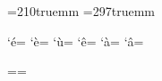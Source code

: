 \relax

\pdfpagewidth=210truemm\relax
\pdfpageheight=297truemm\relax



%
\catcode`é=\active{}
\catcode`è=\active{}
\catcode`ù=\active{}
\catcode`ê=\active{}
\catcode`à=\active{}
\catcode`â=\active{}

\headline={\hfill}\footline={\hfill}%

\def\swap#1#2{\let\temp#1\let#1#2\let#2\temp}
\swap\epsilon\varepsilon
\swap\theta\vartheta
\swap\rho\varrho

\def\e{{\rm e}} 
\def\log{\mathop{\rm log}\nolimits}

\def\ch{\mathop{\rm ch}\nolimits}
\def\sh{\mathop{\rm sh}\nolimits}
\def\th{\mathop{\rm th}\nolimits}

\def\argch{\mathop{\rm Argch}\nolimits}
\def\argsh{\mathop{\rm Argsh}\nolimits}
\def\argth{\mathop{\rm Argth}\nolimits}

\def\arccos{\mathop{\rm Arccos}\nolimits}
\def\arcsin{\mathop{\rm Arcsin}\nolimits}
\def\arctan{\mathop{\rm Arctan}\nolimits}

\def\cotan{\mathop{\rm cotan}\nolimits}

\def\re{{\Re e\ }}
\def\im{{\Im m\ }}

\def\Sim{\mathop{\sim}}
\def\grad{\mathop{\rm grad}\nolimits}
\def\gradv{\mathop{\overrightarrow{\rm grad}}\nolimits}

\def\card{\mathop{\rm card}\nolimits}
\def\dim{\mathop{\rm dim}\nolimits}
\def\det{\mathop{\rm dét}\nolimits}
\def\mod{\mathop{\rm mod}\nolimits}

\endinput
                
                \\paperwidth=210truemm\\relax
                \\paperheight=297truemm\\relax
